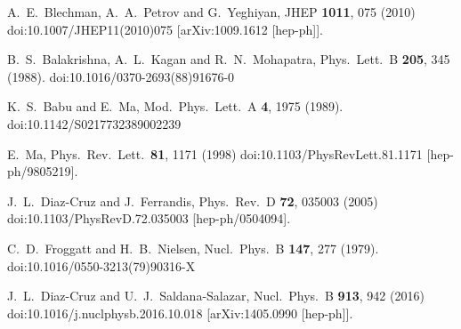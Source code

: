 \documentclass[aps,prd,groupaddress,floatfix,tighten,nofootinbib,showpacs,
amsfonts,superscriptaddress]{revtex4}
\begin{document}
{\begin{thebibliography}{99}
  A.~E.~Blechman, A.~A.~Petrov and G.~Yeghiyan,
  JHEP {\bf 1011}, 075 (2010)
  doi:10.1007/JHEP11(2010)075
  [arXiv:1009.1612 [hep-ph]].
  
  B.~S.~Balakrishna, A.~L.~Kagan and R.~N.~Mohapatra,
  Phys.\ Lett.\ B {\bf 205}, 345 (1988).
  doi:10.1016/0370-2693(88)91676-0
  
  K.~S.~Babu and E.~Ma,
  Mod.\ Phys.\ Lett.\ A {\bf 4}, 1975 (1989).
  doi:10.1142/S0217732389002239
  
  
  E.~Ma,
  Phys.\ Rev.\ Lett.\  {\bf 81}, 1171 (1998)
  doi:10.1103/PhysRevLett.81.1171
  [hep-ph/9805219].
  
  J.~L.~Diaz-Cruz and J.~Ferrandis,
  Phys.\ Rev.\ D {\bf 72}, 035003 (2005)
  doi:10.1103/PhysRevD.72.035003
  [hep-ph/0504094].
  
  C.~D.~Froggatt and H.~B.~Nielsen,
  Nucl.\ Phys.\ B {\bf 147}, 277 (1979).
  doi:10.1016/0550-3213(79)90316-X
  
  J.~L.~Diaz-Cruz and U.~J.~Saldana-Salazar,
  Nucl.\ Phys.\ B {\bf 913}, 942 (2016)
  doi:10.1016/j.nuclphysb.2016.10.018
  [arXiv:1405.0990 [hep-ph]].
  

\end{thebibliography}}
\end{document}
